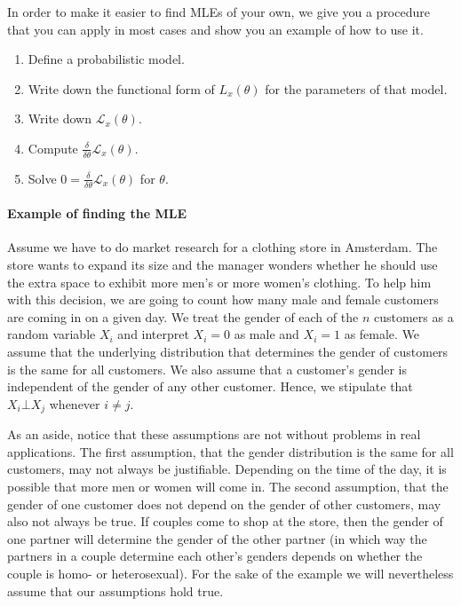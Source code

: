 In order to make it easier to find MLEs of your own, we give you a procedure that you can apply in most cases and
show you an example of how to use it.
\begin{enumerate}
\item Define a probabilistic model.
\item Write down the functional form of $ L_{x}(\theta) $ for the parameters of that model.
\item Write down $ \mathcal{L}_{x}(\theta) $.
\item Compute $ \frac{\delta}{\delta \theta} \mathcal{L}_{x}(\theta) $.
\item Solve $ 0 = \frac{\delta}{\delta \theta} \mathcal{L}_{x}(\theta) $ for $ \theta $.
\end{enumerate}

\paragraph{Example of finding the MLE} Assume we have to do market research for a clothing store in Amsterdam.
The store wants to expand its size and the manager wonders whether he should use the extra space to 
exhibit more men's or more women's clothing. To help him with this decision, we are going to count 
how many male and female customers are coming in on a given day. We treat the gender of each of the $n$ customers
as a random variable $ X_{i}$ and interpret $ X_{i} = 0 $ as male and $ X_{i} = 1 $ as
female. We assume that the underlying distribution that determines the gender of customers
is the same for all customers. We also assume that a customer's gender is independent of the gender of any
other customer. Hence, we stipulate that $ X_{i} \bot X_{j} $ whenever $ i \not = j $.

As an aside, notice that these assumptions are not without problems in real applications. 
The first assumption, that the gender
distribution is the same for all customers, may not always be justifiable. Depending on the time of the day,
it is possible that more men or women will come in. The second assumption, that the gender of one customer
does not depend on the gender of other customers, may also not always be true. If couples come to shop
at the store, then the gender of one partner will determine the gender of the other partner (in which
way the partners in a couple determine each other's genders depends on whether the couple is homo- or
heterosexual). For the sake of the example we will nevertheless assume that our assumptions hold true.

